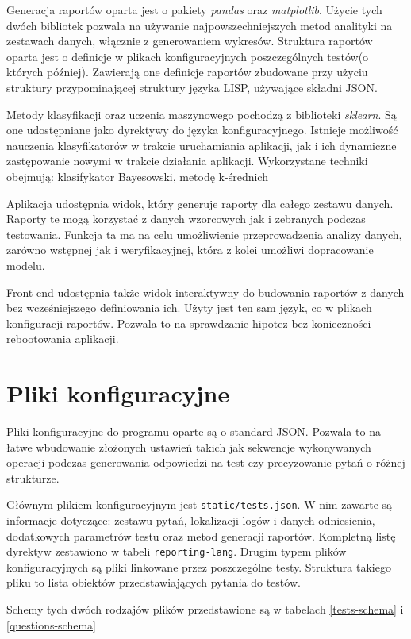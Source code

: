 \documentclass[12pt,a4paper,oneside]{report} %
\begin{document}
Generacja raportów oparta jest o pakiety \emph{pandas} oraz \emph{matplotlib}. Użycie tych dwóch bibliotek pozwala na używanie najpowszechniejszych metod analityki na zestawach danych, włącznie z generowaniem wykresów. Struktura raportów oparta jest o definicje w plikach konfiguracyjnych poszczególnych testów(o których później). Zawierają one definicje raportów zbudowane przy użyciu struktury przypominającej struktury języka LISP, używające składni JSON.

Metody klasyfikacji oraz uczenia maszynowego pochodzą z biblioteki \emph{sklearn}. Są one udostępniane jako dyrektywy do języka konfiguracyjnego. Istnieje możliwość nauczenia klasyfikatorów w trakcie uruchamiania aplikacji, jak i ich dynamiczne zastępowanie nowymi w trakcie działania aplikacji. Wykorzystane techniki obejmują: klasifykator Bayesowski, metodę k-średnich

Aplikacja udostępnia widok, który generuje raporty dla całego zestawu danych. Raporty te mogą korzystać z danych wzorcowych jak i zebranych podczas testowania. Funkcja ta ma na celu umożliwienie przeprowadzenia analizy danych, zarówno wstępnej jak i weryfikacyjnej, która z kolei umożliwi dopracowanie modelu.

Front-end udostępnia także widok interaktywny do budowania raportów z danych bez wcześniejszego definiowania ich. Użyty jest ten sam język, co w plikach konfiguracji raportów. Pozwala to na sprawdzanie hipotez bez konieczności rebootowania aplikacji.

\section{Pliki konfiguracyjne}

Pliki konfiguracyjne do programu oparte są o standard JSON. Pozwala to na łatwe wbudowanie złożonych ustawień takich jak sekwencje wykonywanych operacji podczas generowania odpowiedzi na test czy precyzowanie pytań o różnej strukturze.

Głównym plikiem konfiguracyjnym jest \texttt{static/tests.json}. W nim zawarte są informacje dotyczące: zestawu pytań, lokalizacji logów i danych odniesienia, dodatkowych parametrów testu oraz metod generacji raportów. Kompletną listę dyrektyw zestawiono w tabeli \texttt{reporting-lang}. Drugim typem plików konfiguracyjnych są pliki linkowane przez poszczególne testy. Struktura takiego pliku to lista obiektów przedstawiających pytania do testów.

Schemy tych dwóch rodzajów plików przedstawione są w tabelach \ref{tests-schema} i \ref{questions-schema}
\end{document}
